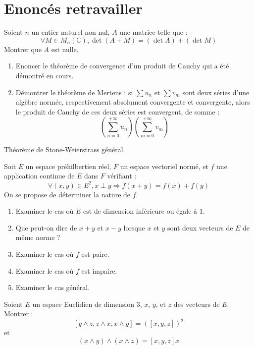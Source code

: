 \section{Enonc\'es  retravailler}

\begin{exer}
Soient $n$ un entier naturel non nul, $A$ une matrice telle que :
\[\forall M \in M_n (\mathbb{C}) , \det (A+M) = (\det A) + (\det M)\]
Montrer que $A$ est nulle.
\end{exer}

\begin{exer}
\begin{enumerate}
\item Enoncer le théorème de convergence d'un produit de Cauchy qui a été démontré en cours.
\item Démontrer le théorème de Mertens : si $\sum u_n$ et $\sum v_m$ sont deux séries d'une algèbre normée, %
respectivement absolument convergente et convergente, alors le produit de Cauchy de ces deux séries est convergent, de somme :
\[(\sum\limits_{n=0}^{+ \infty} u_n)(\sum\limits_{m=0}^{+ \infty} v_m)\]
\end{enumerate}
\end{exer}

\begin{exer}
Théorème de Stone-Weierstrass général.
\end{exer}


\begin{exer}
Soit $E$ un espace préhilbertien réel, $F$ un espace vectoriel normé, et $f$ une application continue de $E$ dans $F$ vérifiant :
\[\forall (x,y) \in E^2 , x \perp y \Rightarrow f(x+y) = f(x) + f(y)\]
On se propose de déterminer la nature de $f$.
\begin{enumerate}
\item Examiner le cas où $E$ est de dimension inférieure ou égale à $1$.
\item Que peut-on dire de $x+y$ et $x-y$ lorsque $x$ et $y$ sont deux vecteurs de $E$ de même norme ?
\item Examiner le cas où $f$ est paire.
\item Examiner le cas où $f$ est impaire.
\item Examiner le cas général.
\end{enumerate}
\end{exer}


\begin{exer}
Soient $E$ un espace Euclidien de dimension $3$, $x$, $y$, et $z$ des vecteurs de $E$.\\
Montrer :
\[[y \wedge z, z \wedge x, x \wedge y] = ([x,y,z])^2\]
et \[(x \wedge y)\wedge (x \wedge z) = [x,y,z]x\]
\end{exer}

